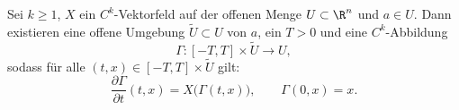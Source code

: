 \documentclass[11pt]{article}
\begin{document}
\begin{theorem}\Theorem
  Sei $k \ge 1$, $X$ ein $C^k$-Vektorfeld auf der offenen Menge $U \subset \R^n$ und $a \in U$. Dann existieren eine offene Umgebung $\tilde{U} \subset U$ von $a$, ein $T > 0$ und eine $C^k$-Abbildung
  \[ \Gamma\colon [-T, T] \times \tilde{U} \to U, \]
  sodass für alle $(t, x) \in [-T, T] \times \tilde{U}$ gilt:
  \[ \frac{\partial \Gamma}{\partial t}(t, x) = X\bigl(\Gamma(t, x)\bigr), \qquad \Gamma(0, x) = x. \]
\end{theorem}




\PropertyNotice
\end{document}
